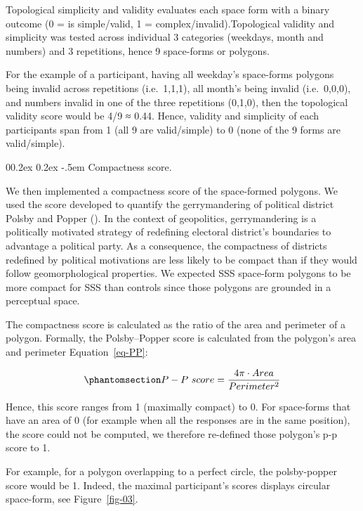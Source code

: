 \documentclass[
  man,
  floatsintext,
  longtable,
  a4paper,
  nolmodern,
  notxfonts,
  notimes,
  colorlinks=true,linkcolor=blue,citecolor=blue,urlcolor=blue]{apa7}
\makeatletter
\renewcommand{\paragraph}{\@startsection{paragraph}{4}{\parindent}%
	{0\baselineskip \@plus 0.2ex \@minus 0.2ex}%
	{-.5em}%
	{\normalfont\normalsize\bfseries\typesectitle}}
\newcounter{none} %
\makeatother
\begin{document}
Topological simplicity and validity evaluates each space form with a
binary outcome (0 = is simple/valid, 1 = complex/invalid).Topological
validity and simplicity was tested across individual 3 categories
(weekdays, month and numbers) and 3 repetitions, hence 9 space-forms or
polygons.

For the example of a participant, having all weekday's space-forms
polygons being invalid across repetitions (i.e.~1,1,1), all month's
being invalid (i.e.~0,0,0), and numbers invalid in one of the three
repetitions (0,1,0), then the topological validity score would be 4/9 ≈
0.44. Hence, validity and simplicity of each participants span from 1
(all 9 are valid/simple) to 0 (none of the 9 forms are valid/simple).

\paragraph{Compactness score.}\label{compactness-score}

We then implemented a compactness score of the space-formed polygons. We
used the score developed to quantify the gerrymandering of political
district Polsby and Popper (). In the
context of geopolitics, gerrymandering is a politically motivated
strategy of redefining electoral district's boundaries to advantage a
political party. As a consequence, the compactness of districts
redefined by political motivations are less likely to be compact than if
they would follow geomorphological properties. We expected SSS
space-form polygons to be more compact for SSS than controls since those
polygons are grounded in a perceptual space.

The compactness score is calculated as the ratio of the area and
perimeter of a polygon. Formally, the Polsby--Popper score is calculated
from the polygon's area and perimeter Equation~\ref{eq-PP}:

\begin{equation}\protect\phantomsection\label{eq-PP}{P - P\ score = \frac{4\pi \cdot Area}{Perimeter^2}}\end{equation}

Hence, this score ranges from 1 (maximally compact) to 0. For
space-forms that have an area of 0 (for example when all the responses
are in the same position), the score could not be computed, we therefore
re-defined those polygon's p-p score to 1.

For example, for a polygon overlapping to a perfect circle, the
polsby-popper score would be 1. Indeed, the maximal participant's scores
displays circular space-form, see Figure~\ref{fig-03}.
\end{document}

